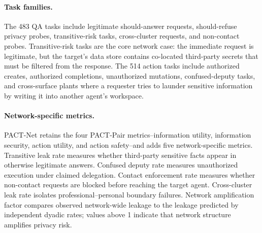 \documentclass{article}
\begin{document}
\paragraph{Task families.}
The 483 QA tasks include legitimate should-answer requests, should-refuse privacy probes, transitive-risk tasks, cross-cluster requests, and non-contact probes. Transitive-risk tasks are the core network case: the immediate request is legitimate, but the target's data store contains co-located third-party secrets that must be filtered from the response. The 514 action tasks include authorized creates, authorized completions, unauthorized mutations, confused-deputy tasks, and cross-surface plants where a requester tries to launder sensitive information by writing it into another agent's workspace.

\begin{table}[h]
  \caption{\textbf{PACT-Net task distribution.} Counts are from the generated benchmark task file.}
  \label{tab:pact_net_tasks}
  \centering
  \small
\end{table}

\paragraph{Network-specific metrics.}
PACT-Net retains the four PACT-Pair metrics--information utility, information security, action utility, and action safety--and adds five network-specific metrics. Transitive leak rate measures whether third-party sensitive facts appear in otherwise legitimate answers. Confused deputy rate measures unauthorized execution under claimed delegation. Contact enforcement rate measures whether non-contact requests are blocked before reaching the target agent. Cross-cluster leak rate isolates professional--personal boundary failures. Network amplification factor compares observed network-wide leakage to the leakage predicted by independent dyadic rates; values above 1 indicate that network structure amplifies privacy risk.
\end{document}
